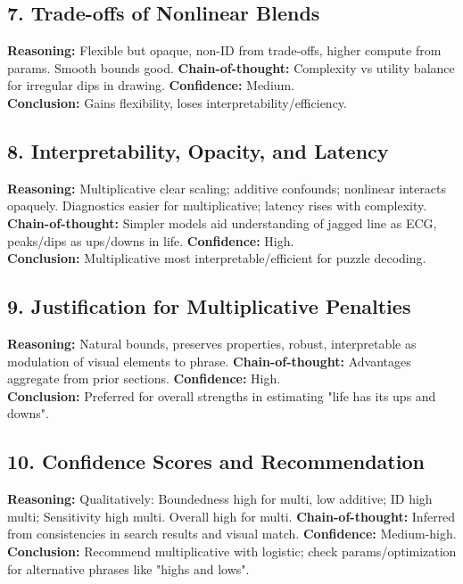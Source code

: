 \documentclass{article}
\begin{document}
\subsection{7. Trade-offs of Nonlinear Blends}
\textbf{Reasoning:} Flexible but opaque, non-ID from trade-offs, higher compute from params. Smooth bounds good. \textbf{Chain-of-thought:} Complexity vs utility balance for irregular dips in drawing. \textbf{Confidence:} Medium.\\
\textbf{Conclusion:} Gains flexibility, loses interpretability/efficiency.

\subsection{8. Interpretability, Opacity, and Latency}
\textbf{Reasoning:} Multiplicative clear scaling; additive confounds; nonlinear interacts opaquely. Diagnostics easier for multiplicative; latency rises with complexity. \textbf{Chain-of-thought:} Simpler models aid understanding of jagged line as ECG, peaks/dips as ups/downs in life. \textbf{Confidence:} High.\\
\textbf{Conclusion:} Multiplicative most interpretable/efficient for puzzle decoding.

\subsection{9. Justification for Multiplicative Penalties}
\textbf{Reasoning:} Natural bounds, preserves properties, robust, interpretable as modulation of visual elements to phrase. \textbf{Chain-of-thought:} Advantages aggregate from prior sections. \textbf{Confidence:} High.\\
\textbf{Conclusion:} Preferred for overall strengths in estimating "life has its ups and downs".

\subsection{10. Confidence Scores and Recommendation}
\textbf{Reasoning:} Qualitatively: Boundedness high for multi, low additive; ID high multi; Sensitivity high multi. Overall high for multi. \textbf{Chain-of-thought:} Inferred from consistencies in search results and visual match. \textbf{Confidence:} Medium-high.\\
\textbf{Conclusion:} Recommend multiplicative with logistic; check params/optimization for alternative phrases like "highs and lows".
\end{document}

